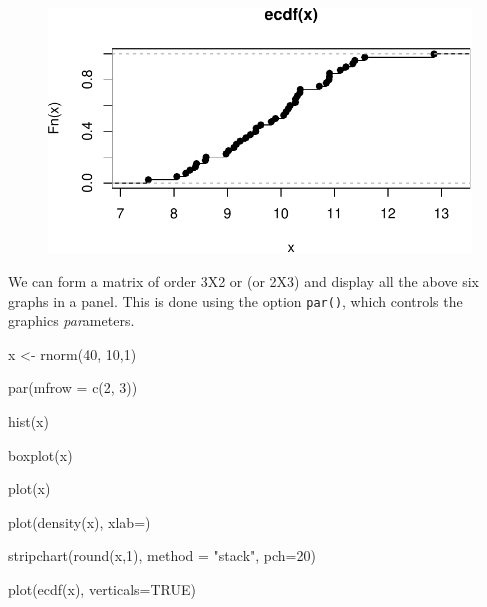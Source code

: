 \documentclass[
  letterpaper,
  DIV=11,
  numbers=noendperiod]{scrreprt}
\newenvironment{Shaded}{\begin{snugshade}}{\end{snugshade}}
\newcommand{\AttributeTok}[1]{\textcolor[rgb]{0.40,0.45,0.13}{#1}}
\newcommand{\ConstantTok}[1]{\textcolor[rgb]{0.56,0.35,0.01}{#1}}
\newcommand{\DecValTok}[1]{\textcolor[rgb]{0.68,0.00,0.00}{#1}}
\newcommand{\FunctionTok}[1]{\textcolor[rgb]{0.28,0.35,0.67}{#1}}
\newcommand{\NormalTok}[1]{\textcolor[rgb]{0.00,0.23,0.31}{#1}}
\newcommand{\OtherTok}[1]{\textcolor[rgb]{0.00,0.23,0.31}{#1}}
\newcommand{\StringTok}[1]{\textcolor[rgb]{0.13,0.47,0.30}{#1}}
\begin{document}
\begin{figure}[H]

{\centering \includegraphics{0-R-tidyverse_files/figure-pdf/unnamed-chunk-18-6.pdf}

}

\end{figure}

We can form a matrix of order 3X2 or (or 2X3) and display all the above
six graphs in a panel. This is done using the option \texttt{par()},
which controls the graphics \emph{par}ameters.

\begin{Shaded}
\begin{Highlighting}[]
\NormalTok{x  }\OtherTok{\textless{}{-}} \FunctionTok{rnorm}\NormalTok{(}\DecValTok{40}\NormalTok{, }\DecValTok{10}\NormalTok{,}\DecValTok{1}\NormalTok{)}

\FunctionTok{par}\NormalTok{(}\AttributeTok{mfrow =} \FunctionTok{c}\NormalTok{(}\DecValTok{2}\NormalTok{, }\DecValTok{3}\NormalTok{))}

\FunctionTok{hist}\NormalTok{(x) }

\FunctionTok{boxplot}\NormalTok{(x)}

\FunctionTok{plot}\NormalTok{(x)}

\FunctionTok{plot}\NormalTok{(}\FunctionTok{density}\NormalTok{(x), }\AttributeTok{xlab=}\StringTok{\textquotesingle{}\textquotesingle{}}\NormalTok{)}

\FunctionTok{stripchart}\NormalTok{(}\FunctionTok{round}\NormalTok{(x,}\DecValTok{1}\NormalTok{), }\AttributeTok{method =} \StringTok{"stack"}\NormalTok{, }\AttributeTok{pch=}\DecValTok{20}\NormalTok{)}

\FunctionTok{plot}\NormalTok{(}\FunctionTok{ecdf}\NormalTok{(x), }\AttributeTok{verticals=}\ConstantTok{TRUE}\NormalTok{)}
\end{Highlighting}
\end{Shaded}
\end{document}
